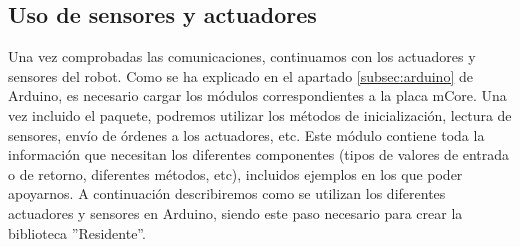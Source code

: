 \subsection{Uso de sensores y actuadores}\label{subsec:sensoresyactuadoresArduino}
Una vez comprobadas las comunicaciones, continuamos con los actuadores y sensores del robot. Como se ha explicado en el apartado \ref{subsec:arduino} de Arduino, es necesario cargar los módulos correspondientes a la placa mCore. Una vez incluido el paquete, podremos utilizar los métodos de inicialización, lectura de sensores, envío de órdenes a los actuadores, etc. Este módulo contiene toda la información que necesitan los diferentes componentes (tipos de valores de entrada o de retorno, diferentes métodos, etc), incluidos ejemplos en los que poder apoyarnos. A continuación describiremos como se utilizan los diferentes actuadores y sensores en Arduino, siendo este paso necesario para crear la biblioteca ''Residente''.\\
